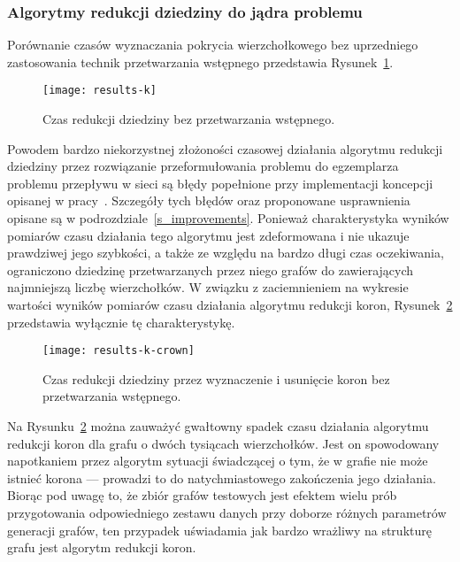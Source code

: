 \subsubsection{\textbf{Algorytmy redukcji dziedziny do jądra problemu}}
\par{
  Porównanie czasów wyznaczania pokrycia wierzchołkowego bez uprzedniego zastosowania technik przetwarzania wstępnego przedstawia Rysunek~\ref{fig_results_k}.
  \begin{figure}
    \caption{Czas redukcji dziedziny bez przetwarzania wstępnego.}
    \label{fig_results_k}
    \centering
      \texttt{[image: results-k]}
  \end{figure}
  Powodem bardzo niekorzystnej złożoności czasowej działania algorytmu redukcji dziedziny przez rozwiązanie przeformułowania problemu do egzemplarza problemu przepływu w sieci są błędy popełnione przy implementacji koncepcji opisanej w pracy~\cite{KernelizationAlgorithms04}.
  Szczegóły tych błędów oraz proponowane usprawnienia opisane są w podrozdziale~\ref{s_improvements}.
  Ponieważ charakterystyka wyników pomiarów czasu działania tego algorytmu jest zdeformowana i nie ukazuje prawdziwej jego szybkości, a także ze względu na bardzo długi czas oczekiwania, ograniczono dziedzinę przetwarzanych przez niego grafów do zawierających najmniejszą liczbę wierzchołków.
  W związku z zaciemnieniem na wykresie wartości wyników pomiarów czasu działania algorytmu redukcji koron, Rysunek~\ref{fig_results_k_crown} przedstawia wyłącznie tę charakterystykę.
  \begin{figure}
    \caption{Czas redukcji dziedziny przez wyznaczenie i usunięcie koron bez przetwarzania wstępnego.}
    \label{fig_results_k_crown}
    \centering
      \texttt{[image: results-k-crown]}
  \end{figure}
}
\par{
  Na Rysunku~\ref{fig_results_k_crown} można zauważyć gwałtowny spadek czasu działania algorytmu redukcji koron dla grafu o dwóch tysiącach wierzchołków.
  Jest on spowodowany napotkaniem przez algorytm sytuacji świadczącej o tym, że w grafie nie może istnieć korona --- prowadzi to do natychmiastowego zakończenia jego działania.
  Biorąc pod uwagę to, że zbiór grafów testowych jest efektem wielu prób przygotowania odpowiedniego zestawu danych przy doborze różnych parametrów generacji grafów, ten przypadek uświadamia jak bardzo wrażliwy na strukturę grafu jest algorytm redukcji koron.
}
